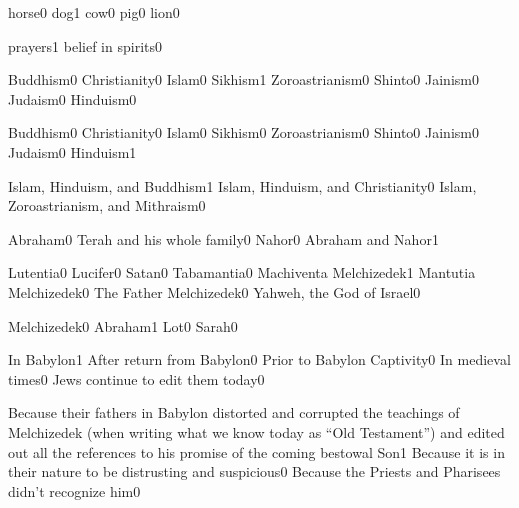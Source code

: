 
{horse}{0}
{dog}{1}
{cow}{0}
{pig}{0}
{lion}{0}
\qstop



{prayers}{1}
{belief in spirits}{0}
\qstop


{Buddhism}{0}
{Christianity}{0}
{Islam}{0}
{Sikhism}{1}
{Zoroastrianism}{0}
{Shinto}{0}
{Jainism}{0}
{Judaism}{0}
{Hinduism}{0}
\qstop

{Buddhism}{0}
{Christianity}{0}
{Islam}{0}
{Sikhism}{0}
{Zoroastrianism}{0}
{Shinto}{0}
{Jainism}{0}
{Judaism}{0}
{Hinduism}{1}
\qstop

{Islam, Hinduism, and Buddhism}{1}
{Islam, Hinduism, and Christianity}{0}
{Islam, Zoroastrianism, and Mithraism}{0}
\qstop


{Abraham}{0}
{Terah and his whole family}{0}
{Nahor}{0}
{Abraham and Nahor}{1}
\qstop

{Lutentia}{0}
{Lucifer}{0}
{Satan}{0}
{Tabamantia}{0}
{Machiventa Melchizedek}{1}
{Mantutia Melchizedek}{0}
{The Father Melchizedek}{0}
{Yahweh, the God of Israel}{0}
\qstop

{Melchizedek}{0}
{Abraham}{1}
{Lot}{0}
{Sarah}{0}
\qstop

{In Babylon}{1}
{After return from Babylon}{0}
{Prior to Babylon Captivity}{0}
{In medieval times}{0}
{Jews continue to edit them today}{0}
\qstop

{Because their fathers in Babylon distorted and corrupted the teachings of Melchizedek (when writing what we know today as ``Old Testament'') and edited out all the references to his promise of the coming bestowal Son}{1}
{Because it is in their nature to be distrusting and suspicious}{0}
{Because the Priests and Pharisees didn't recognize him}{0}
\qstop

